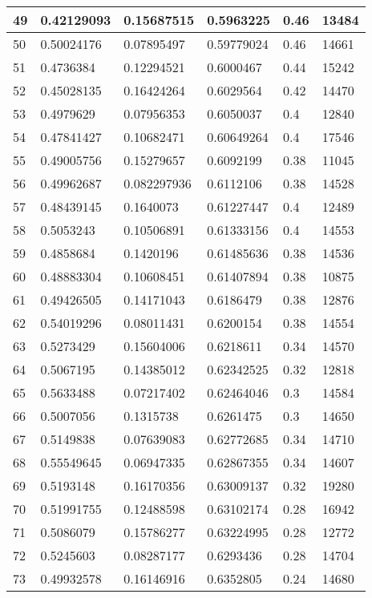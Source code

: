 \begin{longtable}{|l|l|l|l|l|l|}
49 & 0.42129093 & 0.15687515 & 0.5963225 & 0.46 & 13484 \\ \hline 
50 & 0.50024176 & 0.07895497 & 0.59779024 & 0.46 & 14661 \\ \hline 
51 & 0.4736384 & 0.12294521 & 0.6000467 & 0.44 & 15242 \\ \hline 
52 & 0.45028135 & 0.16424264 & 0.6029564 & 0.42 & 14470 \\ \hline 
53 & 0.4979629 & 0.07956353 & 0.6050037 & 0.4 & 12840 \\ \hline 
54 & 0.47841427 & 0.10682471 & 0.60649264 & 0.4 & 17546 \\ \hline 
55 & 0.49005756 & 0.15279657 & 0.6092199 & 0.38 & 11045 \\ \hline 
56 & 0.49962687 & 0.082297936 & 0.6112106 & 0.38 & 14528 \\ \hline 
57 & 0.48439145 & 0.1640073 & 0.61227447 & 0.4 & 12489 \\ \hline 
58 & 0.5053243 & 0.10506891 & 0.61333156 & 0.4 & 14553 \\ \hline 
59 & 0.4858684 & 0.1420196 & 0.61485636 & 0.38 & 14536 \\ \hline 
60 & 0.48883304 & 0.10608451 & 0.61407894 & 0.38 & 10875 \\ \hline 
61 & 0.49426505 & 0.14171043 & 0.6186479 & 0.38 & 12876 \\ \hline 
62 & 0.54019296 & 0.08011431 & 0.6200154 & 0.38 & 14554 \\ \hline 
63 & 0.5273429 & 0.15604006 & 0.6218611 & 0.34 & 14570 \\ \hline 
64 & 0.5067195 & 0.14385012 & 0.62342525 & 0.32 & 12818 \\ \hline 
65 & 0.5633488 & 0.07217402 & 0.62464046 & 0.3 & 14584 \\ \hline 
66 & 0.5007056 & 0.1315738 & 0.6261475 & 0.3 & 14650 \\ \hline 
67 & 0.5149838 & 0.07639083 & 0.62772685 & 0.34 & 14710 \\ \hline 
68 & 0.55549645 & 0.06947335 & 0.62867355 & 0.34 & 14607 \\ \hline 
69 & 0.5193148 & 0.16170356 & 0.63009137 & 0.32 & 19280 \\ \hline 
70 & 0.51991755 & 0.12488598 & 0.63102174 & 0.28 & 16942 \\ \hline 
71 & 0.5086079 & 0.15786277 & 0.63224995 & 0.28 & 12772 \\ \hline 
72 & 0.5245603 & 0.08287177 & 0.6293436 & 0.28 & 14704 \\ \hline 
73 & 0.49932578 & 0.16146916 & 0.6352805 & 0.24 & 14680 \\ \hline 

\end{longtable}
